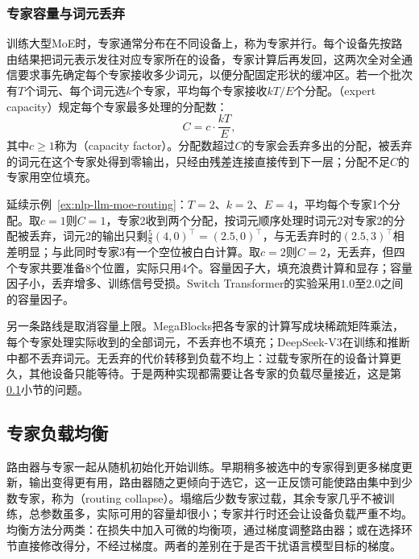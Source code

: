 \subsubsection{专家容量与词元丢弃}
\label{sec:nlp-llm-expert-capacity}

训练大型MoE时，专家通常分布在不同设备上，称为专家并行。每个设备先按路由结果把词元表示发往对应专家所在的设备，专家计算后再发回，这两次全对全通信要求事先确定每个专家接收多少词元，以便分配固定形状的缓冲区。若一个批次有$T$个词元、每个词元选$k$个专家，平均每个专家接收$kT/E$个分配。（expert capacity）规定每个专家最多处理的分配数：
\begin{equation}
 C=c\cdot\frac{kT}{E},
 \label{eq:nlp-llm-capacity}
\end{equation}
其中$c\geq1$称为（capacity factor）。分配数超过$C$的专家会丢弃多出的分配，被丢弃的词元在这个专家处得到零输出，只经由残差连接直接传到下一层；分配不足$C$的专家用空位填充。

延续示例~\ref{ex:nlp-llm-moe-routing}：$T=2$、$k=2$、$E=4$，平均每个专家1个分配。取$c=1$则$C=1$，专家2收到两个分配，按词元顺序处理时词元2对专家2的分配被丢弃，词元2的输出只剩$\tfrac58(4,0)^{\top}=(2.5,0)^{\top}$，与无丢弃时的$(2.5,3)^{\top}$相差明显；与此同时专家3有一个空位被白白计算。取$c=2$则$C=2$，无丢弃，但四个专家共要准备8个位置，实际只用4个。容量因子大，填充浪费计算和显存；容量因子小，丢弃增多、训练信号受损。Switch Transformer的实验采用$1.0$至$2.0$之间的容量因子。

另一条路线是取消容量上限。MegaBlocks把各专家的计算写成块稀疏矩阵乘法，每个专家处理实际收到的全部词元，不丢弃也不填充；DeepSeek-V3在训练和推断中都不丢弃词元。无丢弃的代价转移到负载不均上：过载专家所在的设备计算更久，其他设备只能等待。于是两种实现都需要让各专家的负载尽量接近，这是第\ref{sec:nlp-llm-load-balance}小节的问题。

\subsection{专家负载均衡}
\label{sec:nlp-llm-load-balance}

路由器与专家一起从随机初始化开始训练。早期稍多被选中的专家得到更多梯度更新，输出变得更有用，路由器随之更倾向于选它，这一正反馈可能使路由集中到少数专家，称为（routing collapse）。塌缩后少数专家过载，其余专家几乎不被训练，总参数虽多，实际可用的容量却很小；专家并行时还会让设备负载严重不均。均衡方法分两类：在损失中加入可微的均衡项，通过梯度调整路由器；或在选择环节直接修改得分，不经过梯度。两者的差别在于是否干扰语言模型目标的梯度。

